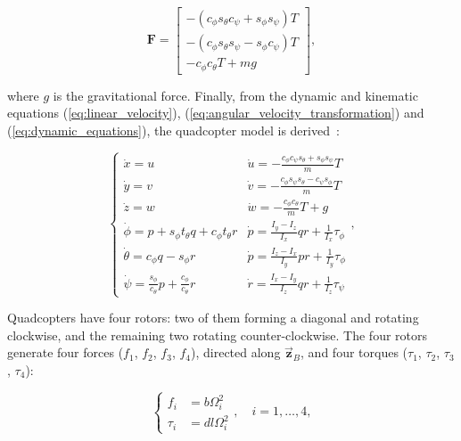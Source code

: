 \begin{equation}
  \mathbf{F} = \begin{bmatrix} -\left( c_{\phi} s_{\theta} c_{\psi} + s_{\phi}
    s_{\psi} \right) T \\ -\left( c_{\phi} s_{\theta} s_{\psi} - s_{\phi} c_{\psi}
    \right) T \\ -c_{\phi} c_{\theta} T + mg\end{bmatrix},
  \label{eq:forces}
\end{equation}

where $g$ is the gravitational force. Finally, from the dynamic and kinematic
equations (\ref{eq:linear_velocity}),
(\ref{eq:angular_velocity_transformation}) and (\ref{eq:dynamic_equations}),
the quadcopter model is derived~\cite{Sarabakha2016CDC}:

\begin{equation}
  \begin{cases}
    \dot{x} = u & \dot{u} = -\frac{c_{\phi} c_{\psi} s_{\theta} + s_{\phi} s_{\psi}}{m} T \\
    \dot{y} = v & \dot{v} = -\frac{c_{\phi} s_{\psi} s_{\theta} - c_{\psi} s_{\phi}}{m} T \\
    \dot{z} = w & \dot{w} = -\frac{c_{\phi} c_{\theta}}{m} T + g \\
    \dot{\phi} = p + s_{\phi} t_{\theta} q + c_{\phi} t_{\theta} r & \dot{p} =
    \frac{I_y - I_z}{I_x} q r + \frac{1}{I_x} \tau_{\phi} \\
    \dot{\theta} = c_{\phi} q - s_{\phi} r & \dot{p} =  \frac{I_z - I_x}{I_y} p
    r + \frac{1}{I_y} \tau_{\phi} \\
    \dot{\psi} = \frac{s_{\phi}}{c_{\theta}} p + \frac{c_{\phi}}{c_{\theta}} r
                                           & \dot{r} =  \frac{I_x - I_y}{I_z} q
                                           r + \frac{1}{I_z} \tau_{\psi}
  \end{cases},
  \label{eq:model}
\end{equation}

Quadcopters have four rotors: two of them forming a diagonal and rotating
clockwise, and the remaining two rotating counter-clockwise. The four rotors
generate four forces ($f_1$, $f_2$, $f_3$, $f_4$), directed along
$\vec{\mathbf{z}}_B$, and four torques ($\tau_1$, $\tau_2$, $\tau_3$,
$\tau_4$):

\begin{equation}
  \begin{cases}
    f_i &= b \Omega_i^2 \\
    \tau_i &= dl \Omega_i^2
  \end{cases}
    , \quad i = 1,\ldots, 4,
  \label{eq:motors}
\end{equation}

